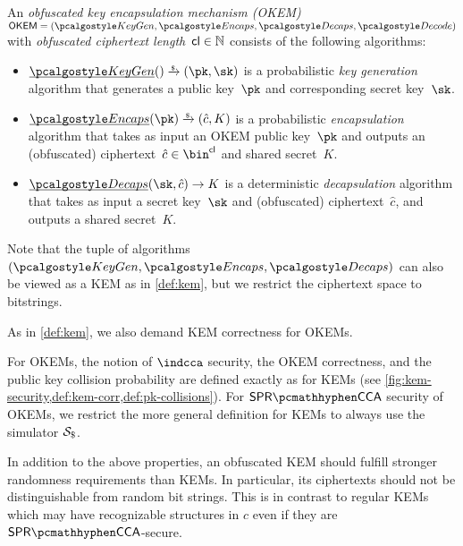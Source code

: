 \begin{definition}
    \label{def:okem}
    An \emph{obfuscated key encapsulation mechanism (OKEM)} $\OKEM = (\kgen, \encaps, \decaps, \decode)$ with \emph{obfuscated ciphertext length}~$\mathsf{cl} \in \mathbb{N}$ consists of the following algorithms:
    \begin{itemize}
        \item $\ul{\kgen}() \tor (\pk,\sk)$ is a probabilistic \emph{key generation} algorithm that generates a public key~$\pk$ and corresponding secret key~$\sk$.

        \item $\ul{\encaps}(\pk) \tor (\hat c, K)$ is a probabilistic \emph{encapsulation} algorithm that takes as input an OKEM public key~$\pk$ and outputs an (obfuscated) ciphertext~$\hat c \in \bin^\obfctxtlen$ and shared secret~$K$.

        \item $\ul{\decaps}(\sk,\hat c) \to K$ is a deterministic \emph{decapsulation} algorithm that takes as input a secret key~$\sk$ and (obfuscated) ciphertext~$\hat c$, and outputs a shared secret~$K$.
    \end{itemize}
    Note that the tuple of algorithms $(\kgen, \encaps, \decaps)$ can also be viewed as a KEM as in \cref{def:kem}, but we restrict the ciphertext space to bitstrings.

    As in \cref{def:kem}, we also demand KEM correctness for OKEMs.
\end{definition}

For OKEMs, the notion of $\indcca$ security, the OKEM correctness, and the public key collision probability are defined exactly as for KEMs (see \cref{fig:kem-security,def:kem-corr,def:pk-collisions}). For $\sprcca$ security of OKEMs, we restrict the more general definition for KEMs to always use the simulator $\simulbin$.

In addition to the above properties, an obfuscated KEM should fulfill stronger randomness requirements than KEMs. In particular, its ciphertexts should not be distinguishable from random bit strings. This is in contrast to regular KEMs which may have recognizable structures in $c$ even if they are $\sprcca$-secure.

